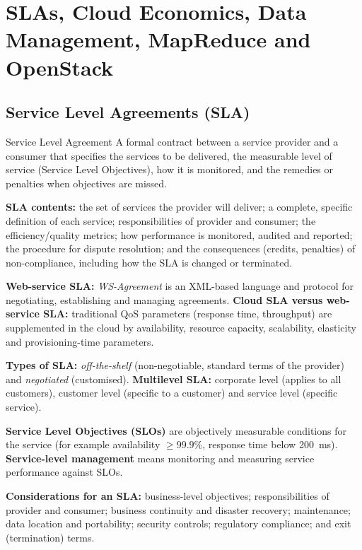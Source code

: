 \chapter{SLAs, Cloud Economics, Data Management, MapReduce and OpenStack}

\section{Service Level Agreements (SLA)}
\begin{defbox}{Service Level Agreement}
A formal contract between a service provider and a consumer that specifies the services to be delivered,
the measurable level of service (Service Level Objectives), how it is monitored, and the remedies or penalties
when objectives are missed.
\end{defbox}

\textbf{SLA contents:} the set of services the provider will deliver; a complete, specific definition of each
service; responsibilities of provider and consumer; the efficiency/quality metrics; how performance is monitored,
audited and reported; the procedure for dispute resolution; and the consequences (credits, penalties) of
non-compliance, including how the SLA is changed or terminated.

\textbf{Web-service SLA:} \emph{WS-Agreement} is an XML-based language and protocol for negotiating, establishing and
managing agreements. \textbf{Cloud SLA versus web-service SLA:} traditional QoS parameters (response time,
throughput) are supplemented in the cloud by availability, resource capacity, scalability, elasticity and
provisioning-time parameters.

\textbf{Types of SLA:} \emph{off-the-shelf} (non-negotiable, standard terms of the provider) and \emph{negotiated}
(customised). \textbf{Multilevel SLA:} corporate level (applies to all customers), customer level (specific to a
customer) and service level (specific service).

\textbf{Service Level Objectives (SLOs)} are objectively measurable conditions for the service (for example
availability $\ge 99.9\%$, response time below 200~ms). \textbf{Service-level management} means monitoring and measuring
service performance against SLOs.

\textbf{Considerations for an SLA:} business-level objectives; responsibilities of provider and consumer;
business continuity and disaster recovery; maintenance; data location and portability; security controls;
regulatory compliance; and exit (termination) terms.

